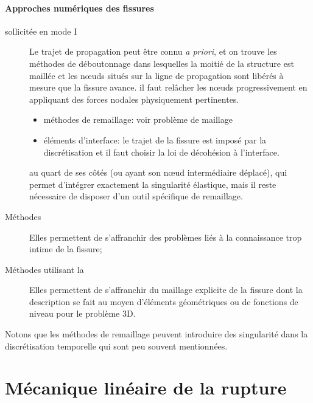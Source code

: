 \paragraph{Approches numériques des fissures}
\begin{description}
  \item[ sollicitée en mode I]
	Le trajet de propagation peut être connu \emph{a priori}, et on trouve les
	méthodes de déboutonnage dans lesquelles la moitié de la structure est
	maillée et les nœuds situés sur la ligne de propagation sont libérés
	à mesure que la fissure avance.  il faut relâcher les nœuds
	progressivement en appliquant des forces nodales physiquement
	pertinentes.
  \item[]\mbox{}
\begin{itemize}
\item méthodes de remaillage:
	voir problème de maillage
  \item éléments d'interface:
	le trajet de la fissure est imposé par la discrétisation et il faut choisir
	la loi de décohésion à l'interface.
	\end{itemize}
  \item[]
	au quart de ses côtés (ou ayant son nœud intermédiaire déplacé), qui
	permet d'intégrer exactement la singularité élastique, mais il reste
	nécessaire de disposer d'un outil spécifique de remaillage.
  \item[Méthodes ] Elles permettent de s'affranchir
	des problèmes liés à la connaissance trop intime de la fissure;
  \item[Méthodes utilisant la ]
	Elles permettent de s'affranchir du maillage explicite de la fissure dont la
	description se fait au moyen d'éléments géométriques ou de fonctions
	de niveau pour le problème 3D.
\end{description}
Notons que les méthodes de remaillage peuvent introduire des singularité dans la
discrétisation temporelle qui sont peu souvent mentionnées.



\medskip
\section{Mécanique linéaire de la rupture}

\medskip
